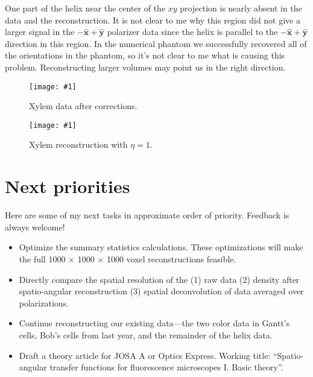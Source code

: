 \documentclass[11pt]{article}
\providecommand{\mh}[1]{\mathbf{\hat{#1}}}
\providecommand{\fig}[4]{
\begin{figure}[H]
 \captionsetup{width=1.0\linewidth}
 \centering
 \texttt{[image: \#1]}
 \caption{#3}
 \label{fig:#4}
\end{figure}
}
\begin{document}
One part of the helix near the center of the $xy$ projection is nearly absent in
the data and the reconstruction. It is not clear to me why this region did not
give a larger signal in the $-\mh{x} + \mh{y}$ polarizer data since the helix is
parallel to the $-\mh{x} + \mh{y}$ direction in this region. In the numerical
phantom we successfully recovered all of the orientations in the phantom, so
it's not clear to me what is causing this problem. Reconstructing larger volumes
may point us in the right direction.

\fig{../figures/xylem-recon/data-corrected.pdf}{1.0}{Xylem data after corrections.}{xylem-data}
\fig{{../figures/xylem-recon/guv-recon-1.0e+00}.pdf}{1.0}{Xylem reconstruction with $\eta = 1$.}{xylem-recon}
\vspace{-2em}
\section{Next priorities}
Here are some of my next tasks in approximate order of priority. Feedback is
always welcome!
\begin{itemize}
\item Optimize the summary statistics calculations. These optimizations will make
  the full 1000 $\times$ 1000 $\times$ 1000 voxel reconstructions feasible.
\item Directly compare the spatial resolution of the (1) raw data (2) density
  after spatio-angular reconstruction (3) spatial deconvolution of data
  averaged over polarizations.
\item Continue reconstructing our existing data---the two color data in Gantt's
  cells, Bob's cells from last year, and the remainder of the helix data.
\item Draft a theory article for JOSA A or Optics Express. Working title:
  ``Spatio-angular transfer functions for fluorescence microscopes I. Basic
  theory''.
\end{itemize}
\end{document}
